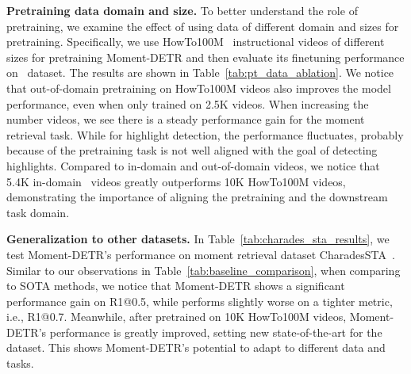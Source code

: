 \begin{table}[t!]
\setlength{\tabcolsep}{0.8em}
\small
\centering
\caption{Effect of pretraining data domain and size, results are on \DatasetName~\textit{val} split. 
}
\label{tab:pt_data_ablation}
\end{table}


\textbf{Pretraining data domain and size.} To better understand the role of pretraining, we examine the effect of using data of different domain and sizes for pretraining. Specifically, we use HowTo100M~\cite{miech2019howto100m} instructional videos of different sizes for pretraining Moment-DETR and then evaluate its finetuning performance on \DatasetName~dataset. The results are shown in Table~\ref{tab:pt_data_ablation}. 
We notice that out-of-domain pretraining on HowTo100M videos also improves the model performance, even when only trained on 2.5K videos. 
When increasing the number videos, we see there is a steady performance gain for the moment retrieval task. While for highlight detection, the performance fluctuates, probably because of the pretraining task is not well aligned with the goal of detecting highlights.
Compared to in-domain and out-of-domain videos, we notice that 5.4K in-domain \DatasetName~videos greatly outperforms 10K HowTo100M videos, demonstrating the importance of aligning the pretraining and the downstream task domain.


\textbf{Generalization to other datasets.} In Table~\ref{tab:charades_sta_results}, we test Moment-DETR's performance on moment retrieval dataset CharadesSTA~\cite{gao2017tall}. 
Similar to our observations in Table~\ref{tab:baseline_comparison}, when comparing to SOTA methods, we notice that Moment-DETR shows a significant performance gain on R1@0.5, while performs slightly worse on a tighter metric, i.e., R1@0.7. 
Meanwhile, after pretrained on 10K HowTo100M videos, Moment-DETR's performance is greatly improved, setting new state-of-the-art for the dataset. This shows Moment-DETR's potential to adapt to different data and tasks.



